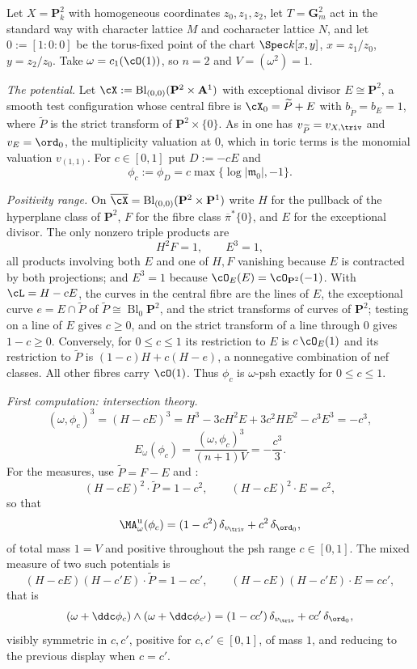 \begin{example}
\label{ex:ch46-toric-p2}
Let $X=\mathbf P^2_k$ with homogeneous coordinates $z_0,z_1,z_2$, let
$T=\mathbf G_m^2$ act in the standard way with character lattice $M$
and cocharacter lattice $N$, and let $0:=[1:0:0]$ be the torus-fixed
point of the chart $\Spec k[x,y]$, $x=z_1/z_0$, $y=z_2/z_0$.  Take
$\omega=c_1(\cO(1))$, so $n=2$ and $V=(\omega^2)=1$.

\emph{The potential.}  Let
$\cX:=\operatorname{Bl}_{(0,0)}(\mathbf P^2\times\mathbf A^1)$ with
exceptional divisor $E\cong\mathbf P^2$, a smooth test configuration
whose central fibre is $\cX_0=\widetilde P+E$ with
$b_{\widetilde P}=b_E=1$, where $\widetilde P$ is the strict transform
of $\mathbf P^2\times\{0\}$.  As in  one
has $v_{\widetilde P}=v_{X,\triv}$ and
$v_E=\ord_0$, the multiplicity valuation at $0$, which in toric terms
is the monomial valuation $v_{(1,1)}$.  For $c\in[0,1]$ put
$D:=-cE$ and
\[
 \phi_c:=\phi_D=c\max\{\log|\mathfrak m_0|,-1\}
.
\]

\emph{Positivity range.}  On $\overline\cX
=\operatorname{Bl}_{(0,0)}(\mathbf P^2\times\mathbf P^1)$ write $H$ for
the pullback of the hyperplane class of $\mathbf P^2$, $F$ for the
fibre class $\overline\pi^*\{0\}$, and $E$ for the exceptional divisor.
The only nonzero triple products are
\[
 H^2F=1,\qquad E^3=1,
\]
all products involving both $E$ and one of $H,F$ vanishing because
$E$ is contracted by both projections; and $E^3=1$ because
$\cO_E(E)=\cO_{\mathbf P^2}(-1)$.  With $\cL=H-cE$, the curves in the
central fibre are the lines of $E$, the exceptional curve
$e=E\cap\widetilde P$ of $\widetilde P\cong\operatorname{Bl}_0\mathbf P^2$,
and the strict transforms of curves of $\mathbf P^2$; testing on a line
of $E$ gives $c\ge0$, and on the strict transform of a line through
$0$ gives $1-c\ge0$.  Conversely, for $0\le c\le1$ its restriction to $E$ is
$c\,\cO_E(1)$ and its restriction to $\widetilde P$ is
$(1-c)H+c(H-e)$, a nonnegative combination of nef classes.
All other fibres carry $\cO(1)$. Thus $\phi_c$ is $\omega$-psh
exactly for $0\le c\le1$.

\emph{First computation: intersection theory.}
\[
 (\omega,\phi_c)^3=(H-cE)^3
 =H^3-3cH^2E+3c^2HE^2-c^3E^3=-c^3,
\]
\[
 E_\omega(\phi_c)=\frac{(\omega,\phi_c)^3}{(n+1)V}=-\frac{c^3}{3}.
\]
For the measures, use $\widetilde P=F-E$ and
:
\[
 (H-cE)^2\cdot\widetilde P=1-c^2,
 \qquad
 (H-cE)^2\cdot E=c^2,
\]
so that
\[
 \MA^{\mathrm u}_\omega(\phi_c)
 =(1-c^2)\,\delta_{v_{\triv}}+c^2\,\delta_{\ord_0},
\]
of total mass $1=V$ and positive throughout the psh range $c\in[0,1]$. The mixed
measure of two such potentials is
\[
 (H-cE)(H-c'E)\cdot\widetilde P=1-cc',
 \qquad
 (H-cE)(H-c'E)\cdot E=cc',
\]
that is
\[
 (\omega+\ddc\phi_c)\wedge(\omega+\ddc\phi_{c'})
 =(1-cc')\,\delta_{v_{\triv}}+cc'\,\delta_{\ord_0},
\]
visibly symmetric in $c,c'$, positive for $c,c'\in[0,1]$, of mass
$1$, and reducing to the previous display when $c=c'$.


\end{example}
